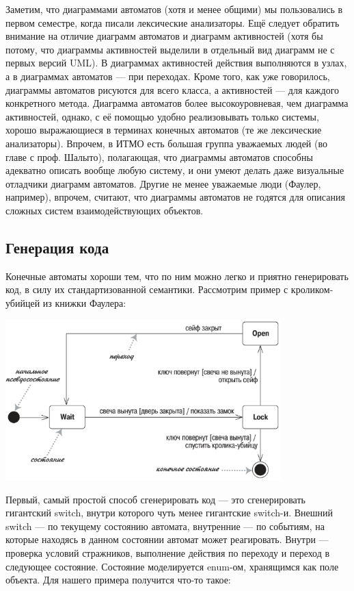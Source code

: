 \documentclass{../../text-style}
\begin{document}
Заметим, что диаграммами автоматов (хотя и менее общими) мы пользовались в первом семестре, когда писали лексические анализаторы. Ещё следует обратить внимание на отличие диаграмм автоматов и диаграмм активностей (хотя бы потому, что диаграммы активностей выделили в отдельный вид диаграмм не с первых версий UML). В диаграммах активностей действия выполняются в узлах, а в диаграммах автоматов --- при переходах. Кроме того, как уже говорилось, диаграммы автоматов рисуются для всего класса, а активностей --- для каждого конкретного метода. Диаграмма автоматов более высокоуровневая, чем диаграмма активностей, однако, с её помощью удобно реализовывать только системы, хорошо выражающиеся в терминах конечных автоматов (те же лексические анализаторы). Впрочем, в ИТМО есть большая группа уважаемых людей (во главе с проф. Шалыто), полагающая, что диаграммы автоматов способны адекватно описать вообще любую систему, и они умеют делать даже визуальные отладчики диаграмм автоматов. Другие не менее уважаемые люди (Фаулер, например), впрочем, считают, что диаграммы автоматов не годятся для описания сложных систем взаимодействующих объектов.

\subsection{Генерация кода}

Конечные автоматы хороши тем, что по ним можно легко и приятно генерировать код, в силу их стандартизованной семантики. Рассмотрим пример с кроликом-убийцей из книжки Фаулера:

\begin{center}
    \includegraphics[width=0.8\textwidth]{stateTransitionSyntax.png}
\end{center}

Первый, самый простой способ сгенерировать код --- это сгенерировать гигантский switch, внутри которого чуть менее гигантские switch-и. Внешний switch --- по текущему состоянию автомата, внутренние --- по событиям, на которые находясь в данном состоянии автомат может реагировать. Внутри --- проверка условий стражников, выполнение действия по переходу и переход в следующее состояние. Состояние моделируется enum-ом, хранящимся как поле объекта. Для нашего примера получится что-то такое:
\end{document}
